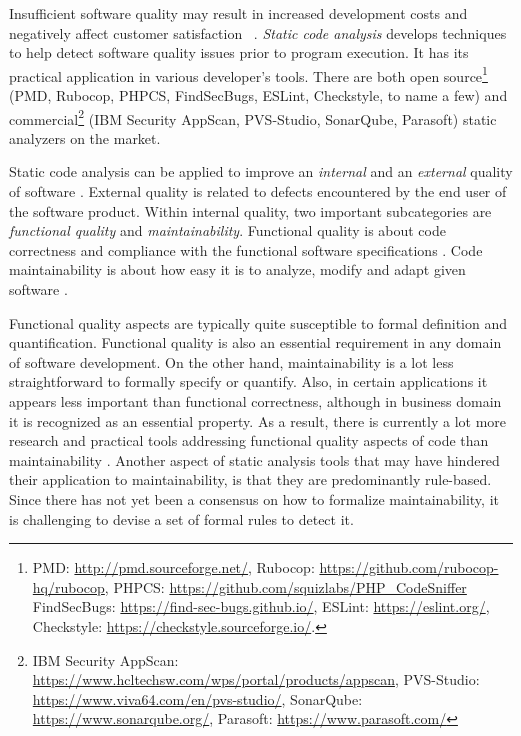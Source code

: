 
Insufficient software quality may result in increased development costs and
negatively affect customer satisfaction ~\citep{The_Economics_of_Software_Quality}.
\textit{Static code analysis} develops techniques to help detect software quality
issues prior to program execution. It has its practical application in various developer's tools. There are both open source\footnote{PMD: \url{http://pmd.sourceforge.net/}, Rubocop: \url{https://github.com/rubocop-hq/rubocop},
PHPCS: \url{https://github.com/squizlabs/PHP_CodeSniffer}
FindSecBugs: \url{https://find-sec-bugs.github.io/}, ESLint: \url{https://eslint.org/}, Checkstyle: \url{https://checkstyle.sourceforge.io/}.}
(PMD, Rubocop, PHPCS, FindSecBugs, ESLint, Checkstyle, to name a few) and commercial\footnote{IBM Security AppScan: \url{https://www.hcltechsw.com/wps/portal/products/appscan},
PVS-Studio: \url{https://www.viva64.com/en/pvs-studio/},
SonarQube: \url{https://www.sonarqube.org/},
Parasoft: \url{https://www.parasoft.com/}}
(IBM Security AppScan, PVS-Studio, SonarQube, Parasoft) static analyzers
on the market.

Static code analysis can be applied to improve an \textit{internal} and an
\textit{external} quality of software \citep{Ilyas2016StaticCA}. External
quality is related to defects encountered by the end user of the software
product. Within internal quality, two important subcategories are
\textit{functional quality} and \textit{maintainability}. Functional quality is
about code correctness and compliance with the functional software
specifications \citep{Farhan}. Code maintainability is about how easy it is to
analyze, modify and adapt given software \citep{Mohammadi2013AnAO}.

Functional quality aspects are typically quite susceptible to formal definition
and quantification.
Functional quality is also an essential
requirement in any domain of software development. On the other hand,
maintainability is a lot less straightforward to formally specify or quantify.
Also, in certain applications it appears less important than
functional correctness, although in business domain it is recognized as an
essential property.
As a result, there is currently a lot more
research and practical tools addressing functional quality aspects of code than
maintainability \citep{Overview_Static_Code_Analysis_in_Software_Development}.
Another aspect of static analysis tools that may have hindered their application
to maintainability, is that they are predominantly rule-based. Since there has
not yet been a consensus on how to formalize maintainability, it is challenging
to devise a set of formal rules to detect it.

